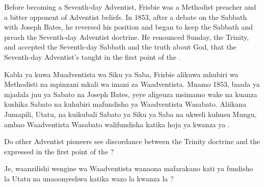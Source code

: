 Before becoming a Seventh-day Adventist, Frisbie was a Methodist preacher and a bitter opponent of Adventist beliefs. In 1853, after a debate on the Sabbath with Joseph Bates, he reversed his position and began to keep the Sabbath and preach the Seventh-day Adventist doctrine. He renounced Sunday, the Trinity, and accepted the Seventh-day Sabbath and the truth about God, that the Seventh-day Adventist’s taught in the first point of the .


Kabla ya kuwa Muadventista wa Siku ya Saba, Frisbie alikuwa mhubiri wa Methodisti na mpinzani mkali wa imani za Waadventista. Mnamo 1853, baada ya mjadala juu ya Sabato na Joseph Bates, yeye aligeuza msimamo wake na kuanza kushika Sabato na kuhubiri mafundisho ya Waadventista Wasabato. Aliikana Jumapili, Utatu, na kuikubali Sabato ya Siku ya Saba na ukweli kuhusu Mungu, ambao Waadventista Wasabato walifundisha katika hoja ya kwanza ya .


Do other Adventist pioneers see discordance between the Trinity doctrine and the  expressed in the first point of the ?


Je, waanzilishi wengine wa Waadventista wanaona mafarakano kati ya fundisho la Utatu na  unaoonyeshwa katika wazo la kwanza la ?







